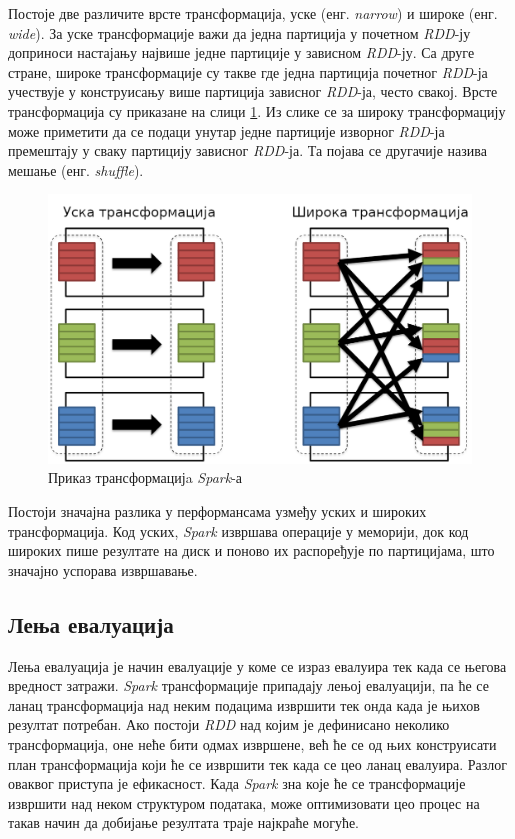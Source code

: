 \documentclass[12pt,oneside]{memoir}
\begin{document}
Постоје две различите врсте трансформација, уске (енг. \textit{narrow}) и широке (енг. \textit{wide}). За уске трансформације важи да једна партиција у почетном \textit{RDD}-ју доприноси настајању највише једне партиције у зависном \textit{RDD}-ју. Са друге стране, широке трансформације су такве где једна партиција почетног \textit{RDD}-ја учествује у конструисању више партиција зависног \textit{RDD}-ја, често свакој. Врсте трансформација су приказане на слици \ref{fig:sprk_trnsf}. Из слике се за широку трансформацију може приметити да се подаци унутар једне партиције изворног \textit{RDD}-ја премештају у сваку партицију зависног \textit{RDD}-ја. Та појава се другачије назива мешање (енг. \textit{shuffle}). \cite{spark_guide}

\begin{figure}[!ht]
  \centering
  \includegraphics[width=1\textwidth]{pictures/spark_transformation_types.png}
  \caption{Приказ трансформацијa \textit{Spark}-а}
  \label{fig:sprk_trnsf}
\end{figure}

Постоји значајна разлика у перформансама узмеђу уских и широких трансформација. Код уских, \textit{Spark} извршава операције у меморији, док код широких пише резултате на диск и поново их распоређује по партицијама, што значајно успорава извршавање. \cite{spark_guide}

\subsection{Лења евалуација}
\label{subsec:spark_lazy_eval}

Лења евалуација је начин евалуације у коме се израз евалуира тек када се његова вредност затражи. \textit{Spark} трансформације припадају лењој евалуацији, па ће се ланац трансформација над неким подацима извршити тек онда када је њихов резултат потребан. Ако постоји \textit{RDD} над којим је дефинисано неколико трансформација, оне неће бити одмах извршене, већ ће се од њих конструисати план трансформација који ће се извршити тек када се цео ланац евалуира. Разлог оваквог приступа је ефикасност. Када \textit{Spark} зна које ће се трансформације извршити над неком структуром података, може оптимизовати цео процес на такав начин да добијање резултата траје најкраће могуће. \cite{spark_guide}
\end{document}
